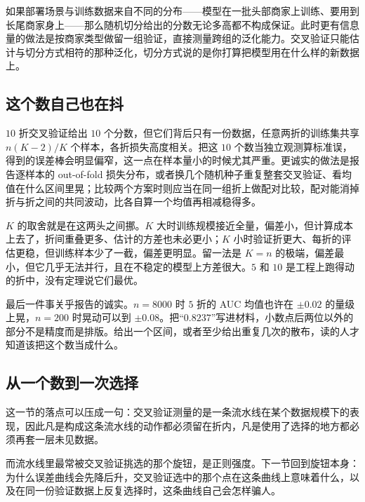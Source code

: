 如果部署场景与训练数据来自不同的分布——模型在一批头部商家上训练、要用到长尾商家身上——那么随机切分给出的分数无论多高都不构成保证。此时更有信息量的做法是按商家类型做留一组验证，直接测量跨组的泛化能力。交叉验证只能估计与切分方式相符的那种泛化，切分方式说的是你打算把模型用在什么样的新数据上。

\subsection{这个数自己也在抖}

\(10\) 折交叉验证给出 \(10\) 个分数，但它们背后只有一份数据，任意两折的训练集共享 \(n(K-2)/K\) 个样本，各折损失高度相关。把这 \(10\) 个数当独立观测算标准误，得到的误差棒会明显偏窄，这一点在样本量小的时候尤其严重。更诚实的做法是报告逐样本的 out-of-fold 损失分布，或者换几个随机种子重复整套交叉验证、看均值在什么区间里晃；比较两个方案时则应当在同一组折上做配对比较，配对能消掉折与折之间的共同波动，比各自算一个均值再相减稳得多。

\(K\) 的取舍就是在这两头之间挪。\(K\) 大时训练规模接近全量，偏差小，但计算成本上去了，折间重叠更多、估计的方差也未必更小；\(K\) 小时验证折更大、每折的评估更稳，但训练样本少了一截，偏差更明显。留一法是 \(K=n\) 的极端，偏差最小，但它几乎无法并行，且在不稳定的模型上方差很大。\(5\) 和 \(10\) 是工程上跑得动的折中，没有定理说它们最优。

最后一件事关乎报告的诚实。\(n=8000\) 时 \(5\) 折的 AUC 均值也许在 \(\pm0.02\) 的量级上晃，\(n=200\) 时晃动可以到 \(\pm0.08\)。把``\(0.8237\)''写进材料，小数点后两位以外的部分不是精度而是排版。给出一个区间，或者至少给出重复几次的散布，读的人才知道该把这个数当成什么。

\subsection{从一个数到一次选择}

这一节的落点可以压成一句：交叉验证测量的是一条流水线在某个数据规模下的表现，因此凡是构成这条流水线的动作都必须留在折内，凡是使用了选择的地方都必须再套一层未见数据。

而流水线里最常被交叉验证挑选的那个旋钮，是正则强度。下一节回到旋钮本身：为什么误差曲线会先降后升，交叉验证选中的那个点在这条曲线上意味着什么，以及在同一份验证数据上反复选择时，这条曲线自己会怎样骗人。
